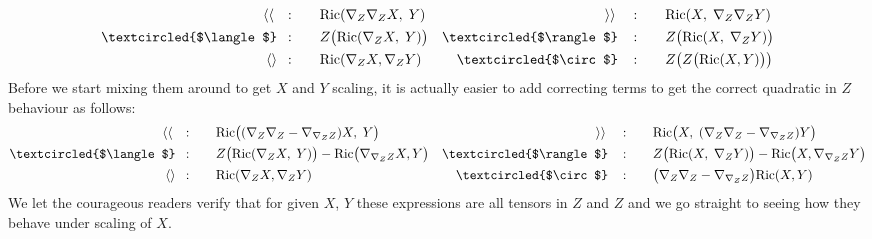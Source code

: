 \documentclass[a4paper,11pt]{article}
\numberwithin{equation}{section}
\theoremstyle{definition}
\newcommand{\R}{{\mathrm{Ric}}}
\begin{document}
\begin{align*}
    \langle\langle \quad:\quad&\quad
    \R(\nabla_Z\nabla_Z X,\;Y)
    &\rangle\rangle \quad:\quad&\quad
    \R(X,\;\nabla_Z\nabla_ZY)\\
    \textcircled{$\langle$}\!\!\! \quad:\quad&\quad
    Z\big(\R(\nabla_Z X,\;Y)\big)
    &\textcircled{$\rangle$}\! \quad:\quad&\quad
    Z\big(\R( X,\;\nabla_ZY)\big)\\
    \langle\rangle \!\!\!\quad:\quad&\quad
    \R(\nabla_Z X, \nabla_Z Y)
    & \textcircled{$\circ$}\! \quad:\quad&\quad
    Z\big(Z\big(\R(X,Y)\big)\big)
\end{align*}
Before we start mixing them around to get $X$ and $Y$ scaling, it is actually easier to add correcting terms to get the correct quadratic in $Z$ behaviour as follows:
\begin{align*}
    \langle\langle \quad:\quad&\quad
    \R\big((\nabla_Z\nabla_Z-\nabla_{\nabla_Z Z}) X,\;Y\big)
    &\rangle\rangle \quad:\quad&\quad
    \R\big(X,\;(\nabla_Z\nabla_Z-\nabla_{\nabla_Z Z})Y\big)\\
    \textcircled{$\langle$}\!\!\! \quad:\quad&\quad
    Z\big(\R(\nabla_Z X,\;Y)\big) - \R\big(\nabla_{\nabla_ZZ}X,Y\big)
    &\textcircled{$\rangle$}\! \quad:\quad&\quad
    Z\big(\R( X,\;\nabla_ZY)\big)- \R\big(X,\nabla_{\nabla_ZZ}Y\big)\\
    \langle\rangle \!\!\!\quad:\quad&\quad
    \R(\nabla_Z X, \nabla_Z Y)
    & \textcircled{$\circ$}\! \quad:\quad&\quad
    \big(\nabla_Z\nabla_Z-\nabla_{\nabla_Z Z}\big)\R(X,Y)
\end{align*}
We let the courageous readers verify that for given $X$, $Y$ these expressions are all tensors in $Z$ and $Z$ and we go straight to seeing how they behave under scaling of $X$.
\end{document}
